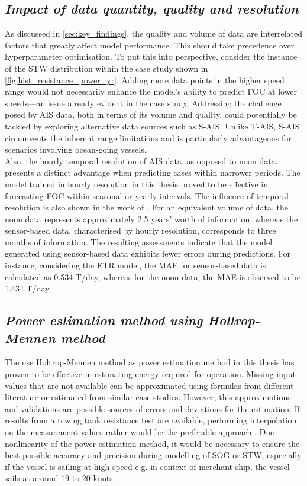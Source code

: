 \subsection*{\emph{Impact of data quantity, quality and resolution}}

As discussed in \cref{sec:key_findings}, the quality and volume of data are interrelated factors that greatly affect model performance. This should take precedence over hyperparameter optimisation. To put this into perspective, consider the instance of the STW distribution within the case study shown in \cref{fig:hist_resistance_power_yr}. Adding more data points in the higher speed range would not necessarily enhance the model's ability to predict FOC at lower speeds—an issue already evident in the case study. Addressing the challenge posed by AIS data, both in terms of its volume and quality, could potentially be tackled by exploring alternative data sources such as S-AIS. Unlike T-AIS, S-AIS circumvents the inherent range limitations and is particularly advantageous for scenarios involving ocean-going vessels.\\   

Also, the hourly temporal resolution of AIS data, as opposed to noon data, presents a distinct advantage when predicting cases within narrower periods. The model trained in hourly resolution in this thesis proved to be effective in forecasting FOC within seasonal or yearly intervals. The influence of temporal resolution is also shown in the work of . For an equivalent volume of data, the noon data represents approximately 2.5 years' worth of information, whereas the sensor-based data, characterised by hourly resolution, corresponds to three months of information. The resulting assessments indicate that the model generated using sensor-based data exhibits fewer errors during predictions. For instance, considering the ETR model, the MAE for sensor-based data is calculated as 0.534 T/day, whereas for the noon data, the MAE is observed to be 1.434 T/day.\\

\subsection*{\emph{Power estimation method using Holtrop-Mennen method}}


The use Holtrop-Mennen method as power estimation method in this thesis has proven to be effective in estimating energy required for operation. Missing input values that are not available can be approximated using formulas from different literature or estimated from similar case studies. However, this approximations and validations are possible sources of errors and deviations for the estimation. If results from a towing tank resistance test are available, performing interpolation on the measurement values rather would be the preferable approach . Due nonlinearity of the power estimation method, it would be necessary to ensure the best possible accuracy and precision during modelling of SOG or STW, especially if the vessel is sailing at high speed e.g. in context of merchant ship, the vessel sails at around 19 to 20 knots.\\ 

